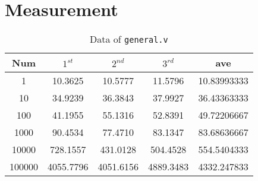 \renewcommand{\baselinestretch}{1.5}
\chapter{Measurement}
\label{App:measurement}
\begin{table}[htbp]
    \centering
    \begin{tabular}{c|c|c|c|c}
    \hline
        Num & $1^{st}$ &$2^{nd}$ &$3^{rd}$ &ave\\
        \hline
        1 &  10.3625& 10.5777&	11.5796&	10.83993333\\
        10 &34.9239&	36.3843	&37.9927&	36.43363333\\
        100 &41.1955&	55.1316	&52.8391&	49.72206667\\
        1000 &90.4534&	77.4710&	83.1347	&83.68636667\\
        10000 &728.1557&	431.0128&	504.4528&	554.5404333\\
        100000 & 4055.7796	&4051.6156&	4889.3483&	4332.247833\\
    \end{tabular}
    \caption{\footnotesize Data of \texttt{general.v}}
    \label{tab:d_g}
\end{table}


